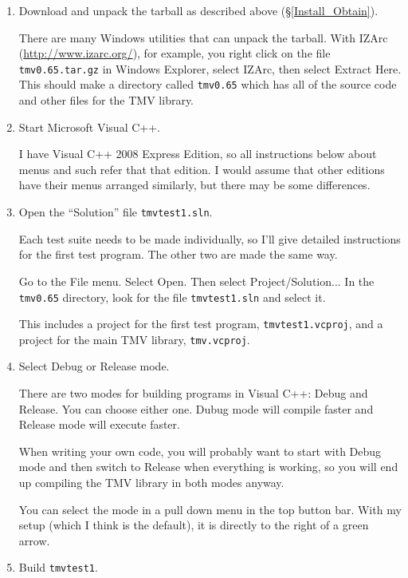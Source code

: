 \documentclass[twoside,letterpaper,11pt]{article}
\newcommand{\tmvversion}{0.65}
\begin{document}
\begin{enumerate}
\item Download and unpack the tarball as described above (\S\ref{Install_Obtain}).

There are many Windows utilities that can unpack the
tarball.  With IZArc (\url{http://www.izarc.org/}), for example, you right click on the file 
\texttt{tmv\tmvversion.tar.gz}
in Windows Explorer, select IZArc, then select Extract Here.  This should make a directory
called \texttt{tmv\tmvversion} which has all of the source code and other files for the TMV library.

\item
Start Microsoft Visual C++.  

I have Visual C++ 2008 Express Edition, so all instructions below
about menus and such refer that that edition.  I would assume that other editions have their 
menus arranged similarly, but there may be some differences.

\item
Open the ``Solution'' file \texttt{tmvtest1.sln}.

Each test suite needs to be made individually, so I'll give detailed instructions for the first
test program.  The other two are made the same way.

Go to the File menu.  Select Open.  Then select Project/Solution...
In the \texttt{tmv\tmvversion} directory, look for the file
\texttt{tmvtest1.sln} and select it.  

This includes a project for the first test program, \texttt{tmvtest1.vcproj}, and a project for
the main TMV library, \texttt{tmv.vcproj}.

\item
Select Debug or Release mode.

There are two modes for building programs in Visual C++: Debug and Release.  
You can choose either one.  Dubug mode will compile faster and 
Release mode will execute faster.  

When writing 
your own code, you will probably want to start with Debug mode and then switch to Release
when everything is working, so you will end up compiling the TMV library in both modes anyway.

You can select the mode in a pull down menu in the top button bar.  With my setup
(which I think is the default), it is directly to the right of a green arrow.

\item
Build \texttt{tmvtest1}.


\end{enumerate}
\end{document}
